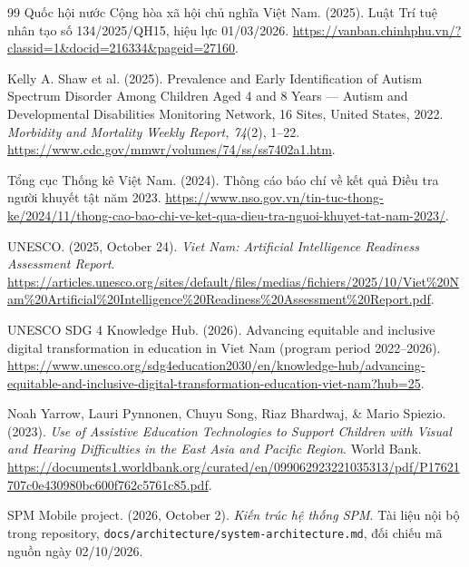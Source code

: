 \documentclass[11pt,a4paper]{article}
\begin{document}
\begin{thebibliography}{99}
Quốc hội nước Cộng hòa xã hội chủ nghĩa Việt Nam.
(2025).
\newblock Luật Trí tuệ nhân tạo số 134/2025/QH15, hiệu lực 01/03/2026.
\newblock \url{https://vanban.chinhphu.vn/?classid=1&docid=216334&pageid=27160}.

Kelly A. Shaw et al.
(2025).
\newblock Prevalence and Early Identification of Autism Spectrum Disorder Among
Children Aged 4 and 8 Years --- Autism and Developmental Disabilities Monitoring
Network, 16 Sites, United States, 2022.
\newblock \emph{Morbidity and Mortality Weekly Report, 74}(2), 1--22.
\newblock \url{https://www.cdc.gov/mmwr/volumes/74/ss/ss7402a1.htm}.

Tổng cục Thống kê Việt Nam.
(2024).
\newblock Thông cáo báo chí về kết quả Điều tra người khuyết tật năm 2023.
\newblock \url{https://www.nso.gov.vn/tin-tuc-thong-ke/2024/11/thong-cao-bao-chi-ve-ket-qua-dieu-tra-nguoi-khuyet-tat-nam-2023/}.

UNESCO.
(2025, October 24).
\newblock \emph{Viet Nam: Artificial Intelligence Readiness Assessment Report}.
\newblock \url{https://articles.unesco.org/sites/default/files/medias/fichiers/2025/10/Viet%20Nam%20Artificial%20Intelligence%20Readiness%20Assessment%20Report.pdf}.

UNESCO SDG 4 Knowledge Hub.
(2026).
\newblock Advancing equitable and inclusive digital transformation in education
in Viet Nam (program period 2022--2026).
\newblock \url{https://www.unesco.org/sdg4education2030/en/knowledge-hub/advancing-equitable-and-inclusive-digital-transformation-education-viet-nam?hub=25}.

Noah Yarrow, Lauri Pynnonen, Chuyu Song, Riaz Bhardwaj, \& Mario Spiezio.
(2023).
\newblock \emph{Use of Assistive Education Technologies to Support Children
with Visual and Hearing Difficulties in the East Asia and Pacific Region}.
\newblock World Bank.
\newblock \url{https://documents1.worldbank.org/curated/en/099062923221035313/pdf/P17621707c0e430980bc600f762c5761c85.pdf}.

SPM Mobile project.
(2026, October 2).
\newblock \emph{Kiến trúc hệ thống SPM}.
\newblock Tài liệu nội bộ trong repository, \texttt{docs/architecture/system-architecture.md},
đối chiếu mã nguồn ngày 02/10/2026.

\end{thebibliography}
\end{document}
